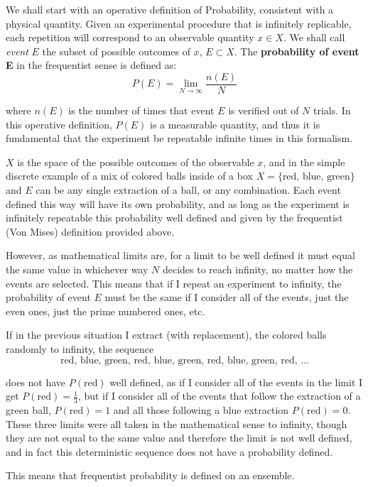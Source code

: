 We shall start with an operative definition of Probability, consistent with a physical quantity. Given an experimental procedure that is infinitely replicable, each repetition will correspond to an observable quantity $x\in X$. We shall call \emph{event} $E$ the subset of possible outcomes of $x$, $E\subset X$. The \textbf{probability of event E} in the frequentist sense is defined as:
	\[
	P(E) = \lim_{N\to\infty} \frac{n(E)}{N}
	\]

where $n(E)$ is the number of times that event $E$ is verified out of $N$ trials. In this operative definition, $P(E)$ is a measurable quantity, and thus it is fundamental that the experiment be repeatable infinite times in this formalism.

$X$ is the space of the possible outcomes of the observable $x$, and in the simple discrete example of a mix of colored balls inside of a box $X=\{ \text{red, blue, green}\}$ and $E$ can be any single extraction of a ball, or any combination. Each event defined this way will have its own probability, and as long as the experiment is infinitely repeatable this probability well defined and given by the frequentist (Von Mises) definition provided above. 


However, as mathematical limits are, for a limit to be well defined it must equal the same value in whichever way $N$ decides to reach infinity, no matter how the events are selected. This means that if I repeat an experiment to infinity, the probability of event $E$ must be the same if I consider all of the events, just the even ones, just the prime numbered ones, etc. 

\begin{example}
	If in the previous situation I extract (with replacement), the colored balls randomly to infinity, the sequence 
	\[
	\text{red, blue, green, red, blue, green, red, blue, green, red, }\dots
	\]
	
	does not have $P(\text{red})$ well defined, as if I consider all of the events in the limit I get $P(\text{red})=\frac{1}{3}$, but if I consider all of the events that follow the extraction of a green ball, $P(\text{red})=1$ and all those following a blue extraction $P(\text{red})=0$. These three limits were all taken in the mathematical sense to infinity, though they are not equal to the same value and therefore the limit is not well defined, and in fact this deterministic sequence does not have a probability defined. 
\end{example}

This means that frequentist probability is defined on an ensemble.


